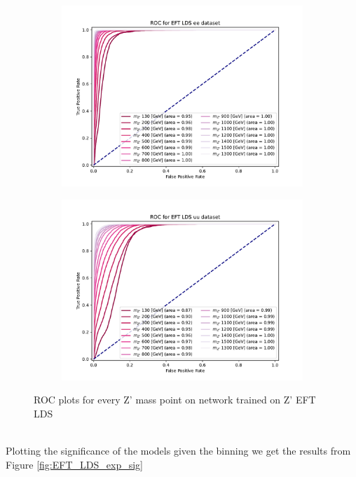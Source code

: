 \documentclass[12pt, a4paper]{book}
\begin{document}
\begin{figure}[!ht]
	\centering
	\begin{subfigure}[b]{0.49\textwidth}
      \centering
      \includegraphics[width=1\textwidth]{XGBoost/EFT_LDS/ROC_ee.pdf}
      \end{subfigure}
   \hfill
   \begin{subfigure}[b]{0.49\textwidth}
      \centering
      \includegraphics[width=1\textwidth]{XGBoost/EFT_LDS/ROC_uu.pdf}
      \end{subfigure}
   \caption{ROC plots for every Z' mass point on network trained on Z' EFT LDS}\label{fig:EFT_LDS_ROCS}
\end{figure}
\\Plotting the significance of the models given the binning we get the results from Figure \ref{fig:EFT_LDS_exp_sig}
\end{document}
